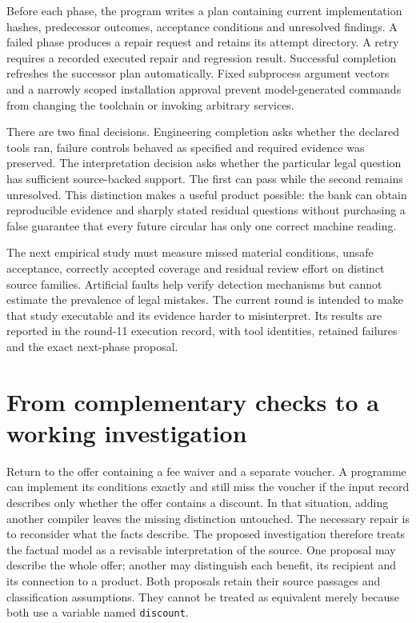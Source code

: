 \documentclass[12pt,a4paper,oneside,openany]{book}
\begin{document}
Before each phase, the program writes a plan containing current implementation
hashes, predecessor outcomes, acceptance conditions and unresolved findings. A
failed phase produces a repair request and retains its attempt directory. A
retry requires a recorded executed repair and regression result. Successful
completion refreshes the successor plan automatically. Fixed subprocess argument
vectors and a narrowly scoped installation approval prevent model-generated
commands from changing the toolchain or invoking arbitrary services.

There are two final decisions. Engineering completion asks whether the declared
tools ran, failure controls behaved as specified and required evidence was
preserved. The interpretation decision asks whether the particular legal question
has sufficient source-backed support. The first can pass while the second remains
unresolved. This distinction makes a useful product possible: the bank can obtain
reproducible evidence and sharply stated residual questions without purchasing a
false guarantee that every future circular has only one correct machine reading.

The next empirical study must measure missed material conditions, unsafe
acceptance, correctly accepted coverage and residual review effort on distinct
source families. Artificial faults help verify detection mechanisms but cannot
estimate the prevalence of legal mistakes. The current round is intended to make
that study executable and its evidence harder to misinterpret. Its results are
reported in the round-11 execution record, with tool identities, retained failures
and the exact next-phase proposal.

\section{From complementary checks to a working investigation}
\label{sec:integrated-investigation}

Return to the offer containing a fee waiver and a separate voucher. A programme
can implement its conditions exactly and still miss the voucher if the input
record describes only whether the offer contains a discount. In that situation,
adding another compiler leaves the missing distinction untouched. The necessary
repair is to reconsider what the facts describe. The proposed investigation
therefore treats the factual model as a revisable interpretation of the source.
One proposal may describe the whole offer; another may distinguish each benefit,
its recipient and its connection to a product. Both proposals retain their
source passages and classification assumptions. They cannot be treated as
equivalent merely because both use a variable named \texttt{discount}.
\end{document}
